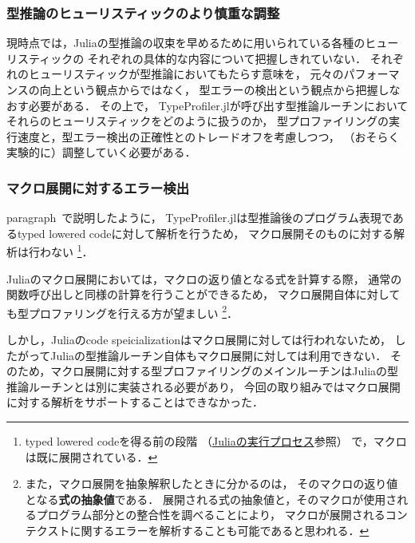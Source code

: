 \subsubsection{型推論のヒューリスティックのより慎重な調整}

現時点では，Juliaの型推論の収束を早めるために用いられている各種のヒューリスティックの
それぞれの具体的な内容について把握しきれていない．
それぞれのヒューリスティックが型推論においてもたらす意味を，
元々のパフォーマンスの向上という観点からではなく，
型エラーの検出という観点から把握しなおす必要がある．
その上で，
TypeProfiler.jlが呼び出す型推論ルーチンにおいてそれらのヒューリスティックをどのように扱うのか，
型プロファイリングの実行速度と，型エラー検出の正確性とのトレードオフを考慮しつつ，
（おそらく実験的に）調整していく必要がある．

\subsubsection{マクロ展開に対するエラー検出}

paragraph~\label{paragraph:type-profiler-basic-implementation}で説明したように，
TypeProfiler.jlは型推論後のプログラム表現であるtyped lowered codeに対して解析を行うため，
マクロ展開そのものに対する解析は行わない
\footnote{
  typed lowered codeを得る前の段階
  （\hyperref[subsubsection:eval-process]{Juliaの実行プロセス}参照）
  で，マクロは既に展開されている．
}．

Juliaのマクロ展開においては，マクロの返り値となる式を計算する際，
通常の関数呼び出しと同様の計算を行うことができるため，
マクロ展開自体に対しても型プロファリングを行える方が望ましい
\footnote{
  また，マクロ展開を抽象解釈したときに分かるのは，
  そのマクロの返り値となる\textbf{式の抽象値}である．
  展開される式の抽象値と，そのマクロが使用されるプログラム部分との整合性を調べることにより，
  マクロが展開されるコンテクストに関するエラーを解析することも可能であると思われる．
}．

しかし，Juliaのcode speicializationはマクロ展開に対しては行われないため，
したがってJuliaの型推論ルーチン自体もマクロ展開に対しては利用できない．
そのため，マクロ展開に対する型プロファイリングのメインルーチンはJuliaの型推論ルーチンとは別に実装される必要があり，
今回の取り組みではマクロ展開に対する解析をサポートすることはできなかった．
